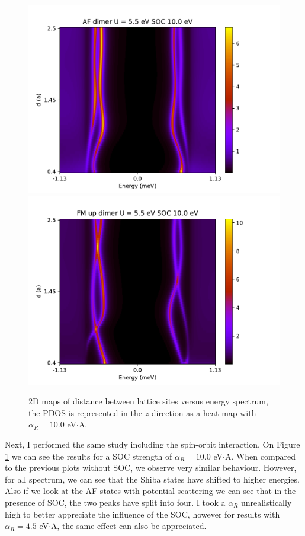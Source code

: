 \documentclass[letterpaper,12pt]{article}
\begin{document}
\begin{figure}[h!]
    \includegraphics[scale = .5]{AF_dimer_SOC_10_U.pdf}
    \includegraphics[scale = .5]{FM_dimer_SOC_10_U.pdf}
    
    \caption{2D maps of distance between lattice sites versus energy spectrum, the PDOS is represented in the $z$ direction as a heat map with $\alpha_R = 10.0$ eV$\cdot$A.}
    \label{dimerwithSOC}
\end{figure}

Next, I performed the same study including the spin-orbit interaction. On Figure \ref{dimerwithSOC} we can see the results for a SOC strength of $\alpha_R =10.0$ eV$\cdot$A. When compared to the previous plots without SOC, we observe very similar behaviour. However, for all spectrum, we can see that the Shiba states have shifted to higher energies. Also if we look at the AF states with potential scattering we can see that in the presence of SOC, the two peaks have split into four. I took a $\alpha_R$ unrealistically high to better appreciate the influence of the SOC, however for results with $\alpha_R = 4.5$ eV$\cdot$A, the same effect can also be appreciated.
\end{document}
